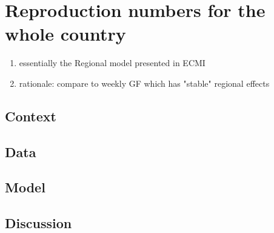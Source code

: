 \section{Reproduction numbers for the whole country}%
\label{sec:spatial_reproduction_number_model}

\begin{enumerate}
    \item essentially the Regional model presented in ECMI
    \item rationale: compare to weekly GF which has "stable" regional effects
\end{enumerate}

\subsection{Context}
\subsection{Data}
\subsection{Model}
\subsection{Discussion}